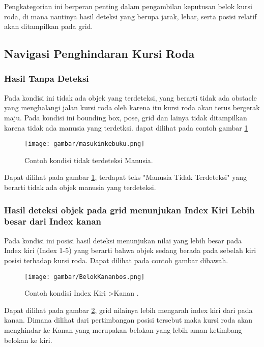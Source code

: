 Pengkategorian ini berperan penting dalam pengambilan keputusan belok kursi roda, di mana nantinya hasil deteksi yang berupa jarak, lebar, serta posisi relatif akan ditampilkan pada grid.

\subsection{Navigasi Penghindaran Kursi Roda}

\subsubsection{Hasil Tanpa Deteksi}
Pada kondisi ini tidak ada objek yang terdeteksi, yang berarti tidak ada obstacle yang menghalangi jalan kursi roda oleh karena itu kursi roda akan terus bergerak maju. Pada kondisi ini bounding box, pose, grid dan lainya tidak ditampilkan karena tidak ada manusia yang terdetksi. dapat dilihat pada contoh gambar \ref{fig:Kondisi tanpa deteksi}

\begin{figure}[H]
    \centering
    \texttt{[image: gambar/masukinkebuku.png]}
    \caption{Contoh kondisi tidak terdeteksi Manusia.}
    \label{fig:Kondisi tanpa deteksi}
\end{figure}

Dapat dilihat pada gambar \ref{fig:Kondisi tanpa deteksi}, terdapat teks "Manusia Tidak Terdeteksi" yang berarti tidak ada objek manusia yang terdeteksi.

\subsubsection{Hasil deteksi objek pada grid menunjukan Index Kiri Lebih besar
dari Index kanan}
Pada kondisi ini posisi hasil deteksi menunjukan nilai yang lebih besar pada Index kiri (Index 1-5) yang berarti bahwa objek sedang berada pada sebelah kiri posisi terhadap kursi roda. Dapat dilihat pada contoh gambar dibawah.

\begin{figure}[H]
  \centering
  \texttt{[image: gambar/BelokKananbos.png]}
  \caption{Contoh kondisi Index Kiri \textgreater Kanan .}
  \label{fig:Kondisi Index Kiri>Kanan.}
\end{figure}

Dapat dilihat pada gambar \ref{fig:Kondisi Index Kiri>Kanan.}, grid nilainya lebih mengarah index kiri dari pada kanan. Dimana dilihat dari pertimbangan posisi tersebut maka kursi roda akan menghindar ke Kanan yang merupakan belokan yang lebih aman ketimbang belokan ke kiri.

